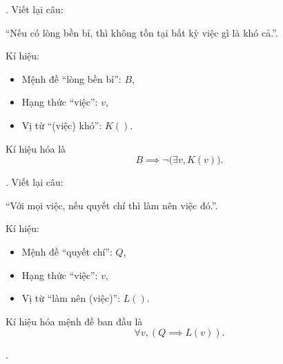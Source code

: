 . Viết lại câu:
\begin{center}
    ``Nếu có lòng bền bỉ, thì không tồn tại bất kỳ việc gì là khó cả.''.
\end{center}
Kí hiệu:
\begin{itemize}
    \item Mệnh đề ``lòng bền bỉ'': $B$,
    \item Hạng thức ``việc'': $v$,
    \item Vị từ ``(việc) khó'': $K()$.
\end{itemize}
Kí hiệu hóa là
\begin{equation*}
    B \implies \neg \big(\exists v, K(v)\big).
\end{equation*}

. Viết lại câu:
\begin{center}
    ``Với mọi việc, nếu quyết chí thì làm nên việc đó.''.
\end{center}
Kí hiệu:
\begin{itemize}
    \item Mệnh đề ``quyết chí'': $Q$,
    \item Hạng thức ``việc'': $v$,
    \item Vị từ ``làm nên (việc)'': $L()$.
\end{itemize}
Kí hiệu hóa mệnh đề ban đầu là
\begin{equation*}
    \forall v, (Q \implies L(v)).
\end{equation*}

.